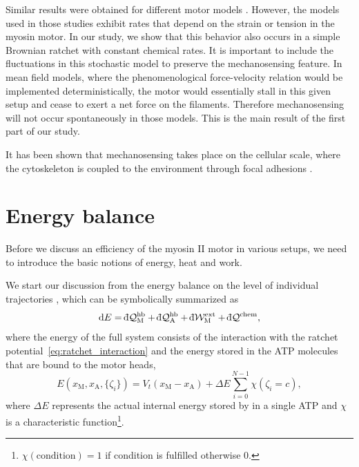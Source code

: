 \documentclass[aps,pre,twocolumn,showpacs,showkeys,superscriptaddress,floatfix]{revtex4-1}
\newcommand{\rmd}{{\mathrm d}}
\newcommand{\dbar}{{\mathchar '26 \mkern-11mu {\mathrm d}}}
\begin{document}
Similar results were obtained for different motor models \cite{stam2015isoforms,Albert2014}. 
However, the models used in those studies exhibit rates that depend on the strain or tension in the myosin motor. 
In our study, we show that this behavior also occurs in a simple Brownian ratchet with constant chemical rates.
It is important to include the fluctuations in this stochastic model to preserve the mechanosensing feature.
In mean field models, where the phenomenological force-velocity relation would be implemented deterministically, 
the motor would essentially stall in this given setup and cease to exert a net force on the filaments. 
Therefore mechanosensing will not occur spontaneously in those models.
This is the main result of the first part of our study. 

It has been shown that mechanosensing takes place on the cellular scale, 
where the cytoskeleton is coupled to the environment through focal adhesions \cite{geiger2009environmental}.

\section{Energy balance}
\label{sec:energie}
Before we discuss an efficiency of the myosin II motor in various setups,
we need to introduce the basic notions of energy, heat and work. 

We start our discussion from the energy balance on the level of individual trajectories \cite{Pesek2013},
which can be symbolically summarized as 
\begin{equation}
\rmd E = \dbar {\mathcal Q}_\text{M}^\text{hb} + \dbar {\mathcal Q}_\text{A}^\text{hb} + \dbar {\mathcal W}^\text{ext}_\text{M} + \dbar {\mathcal Q}^\text{chem}, 
\label{eq:energy_balance}
\end{equation}
where the energy of the full system consists of the interaction with the ratchet potential~\eqref{eq:ratchet_interaction}
and the energy stored in the ATP molecules that are bound to the motor heads,
\begin{equation}
E( x_\text{M}, x_\text{A}, \{ \zeta_i \}) = V_t( x_\text{M} - x_\text{A} ) + \Delta E \sum\limits_{i=0}^{N-1} \chi( \zeta_i = c ) ,
\label{eq:internal_energy}
\end{equation}
where $\Delta E$ represents the actual internal energy stored by in a single ATP and $\chi$ is a characteristic function\footnote{
$\chi(\text{condition}) = 1$ if condition is fulfilled otherwise $0$.
}.
\end{document}

